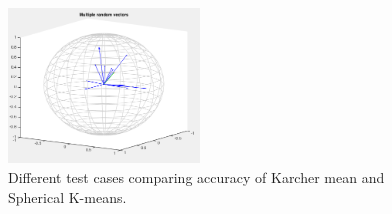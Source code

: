 \documentclass[../tech_report_1.tex]{subfiles}
\begin{document}
\begin{figure}[ht]
\begin{centering}
\includegraphics[width=2in]{fig5.png}
\par\end{centering}

\caption{Different test cases comparing accuracy of Karcher mean and Spherical
K-means.\label{fig:Different-test-cases}}


\end{figure}


\end{document}
